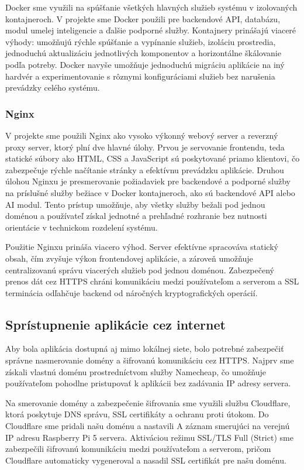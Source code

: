Docker sme využili na spúšťanie všetkých hlavných služieb systému v izolovaných kontajneroch. V projekte sme Docker použili pre backendové API, databázu, modul umelej inteligencie a ďalšie podporné služby. Kontajnery prinášajú viaceré výhody: umožňujú rýchle spúšťanie a vypínanie služieb, izoláciu prostredia, jednoduchú aktualizáciu jednotlivých komponentov a horizontálne škálovanie podľa potreby. Docker navyše umožňuje jednoduchú migráciu aplikácie na iný hardvér a experimentovanie s rôznymi konfiguráciami služieb bez narušenia prevádzky celého systému.

\subsubsection{Nginx}

V projekte sme použili Nginx ako vysoko výkonný webový server a reverzný proxy server, ktorý plní dve hlavné úlohy. Prvou je servovanie frontendu, teda statické súbory ako HTML, CSS a JavaScript sú poskytované priamo klientovi, čo zabezpečuje rýchle načítanie stránky a efektívnu prevádzku aplikácie. Druhou úlohou Nginxu je presmerovanie požiadaviek pre backendové a podporné služby na príslušné služby bežiace v Docker kontajneroch, ako sú backendové API alebo AI modul. Tento prístup umožňuje, aby všetky služby bežali pod jednou doménou a používateľ získal jednotné a prehľadné rozhranie bez nutnosti orientácie v technickom rozdelení systému.

Použitie Nginxu prináša viacero výhod. Server efektívne spracováva statický obsah, čím zvyšuje výkon frontendovej aplikácie, a zároveň umožňuje centralizovanú správu viacerých služieb pod jednou doménou. Zabezpečený prenos dát cez HTTPS chráni komunikáciu medzi používateľom a serverom a SSL terminácia odľahčuje backend od náročných kryptografických operácií.

\subsection{Sprístupnenie aplikácie cez internet}

Aby bola aplikácia dostupná aj mimo lokálnej siete, bolo potrebné zabezpečiť správne nasmerovanie domény a šifrovanú komunikáciu cez HTTPS. Najprv sme získali vlastnú doménu prostredníctvom služby Namecheap, čo umožňuje používateľom pohodlne pristupovať k aplikácii bez zadávania IP adresy servera.

Na smerovanie domény a zabezpečenie šifrovania sme využili službu Cloudflare, ktorá poskytuje DNS správu, SSL certifikáty a ochranu proti útokom. Do Cloudflare sme pridali našu doménu a nastavili A záznam smerujúci na verejnú IP adresu Raspberry Pi 5 servera. Aktiváciou režimu SSL/TLS Full (Strict) sme zabezpečili šifrovanú komunikáciu medzi používateľom a serverom, pričom Cloudflare automaticky vygeneroval a nasadil SSL certifikát pre našu doménu.

